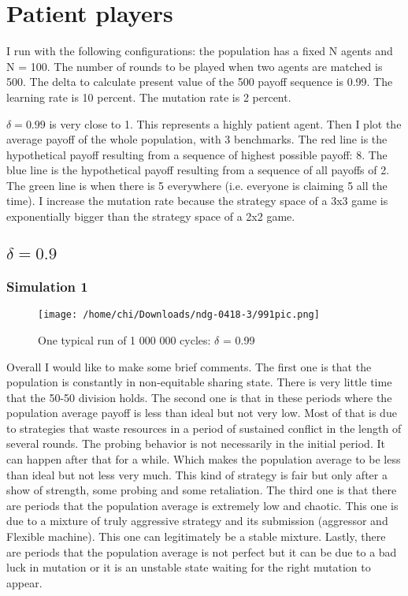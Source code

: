 \documentclass[12.5pt]{report}
\begin{document}
\section{Patient players}

I run with the following configurations: the population has a fixed N agents and N = 100. The number of rounds to be played when two agents are matched is 500. The delta to calculate present value of the 500 payoff sequence is 0.99. The learning rate is 10 percent. The mutation rate is 2 percent.

$\delta = 0.99$ is very close to 1. This represents a highly patient agent. Then I plot the average payoff of the whole population, with 3 benchmarks. The red line is the hypothetical payoff resulting from a sequence of highest possible payoff: 8. The blue line is the hypothetical payoff resulting from a sequence of all payoffs of 2. The green line is when there is 5 everywhere (i.e. everyone is claiming 5 all the time). I increase the mutation rate because the strategy space of a 3x3 game is exponentially bigger than the strategy space of a 2x2 game.\\

\subsection{$\delta = 0.9$}

\subsubsection{Simulation 1}

\begin{figure}[h!]
\center
\texttt{[image: /home/chi/Downloads/ndg-0418-3/991pic.png]}
\caption{One typical run of 1 000 000 cycles: $\delta$ = 0.99}
\end{figure}

Overall I would like to make some brief comments. The first one is that the population is constantly in non-equitable sharing state. There is very little time that the 50-50 division holds. The second one is that in these periods where the population average payoff is less than ideal but not very low. Most of that is due to strategies that waste resources in a period of sustained conflict in the length of several rounds. The probing behavior is not necessarily in the initial period. It can happen after that for a while. Which makes the population average to be less than ideal but not less very much. This kind of strategy is fair but only after a show of strength, some probing and some retaliation. The third one is that there are periods that the population average is extremely low and chaotic. This one is due to a mixture of truly aggressive strategy and its submission (aggressor and Flexible machine). This one can legitimately be a stable mixture. Lastly, there are periods that the population average is not perfect but it can be due to a bad luck in mutation or it is an unstable state waiting for the right mutation to appear.\\
\end{document}
